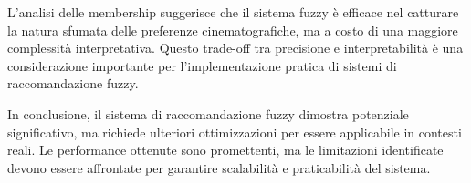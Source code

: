 L'analisi delle membership suggerisce che il sistema fuzzy è efficace nel catturare la natura sfumata delle preferenze cinematografiche, ma a costo di una maggiore complessità interpretativa. Questo trade-off tra precisione e interpretabilità è una considerazione importante per l'implementazione pratica di sistemi di raccomandazione fuzzy.

In conclusione, il sistema di raccomandazione fuzzy dimostra potenziale significativo, ma richiede ulteriori ottimizzazioni per essere applicabile in contesti reali. Le performance ottenute sono promettenti, ma le limitazioni identificate devono essere affrontate per garantire scalabilità e praticabilità del sistema.
